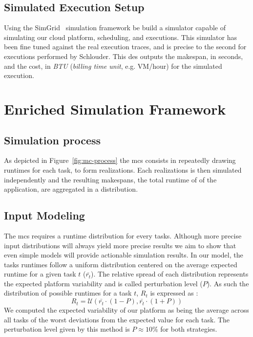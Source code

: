\documentclass[10pt,conference,compsocconf]{IEEEtran}
\begin{document}
\subsection{Simulated Execution Setup}
Using the SimGrid~\cite{simgrid} simulation framework  be build a simulator
capable of simulating our cloud platform, scheduling, and executions. This
simulator has been fine tuned against the real execution traces, and is precise
to the second for executions performed by Schlouder. This \ac{des} outputs the
makespan, in seconds, and the cost, in \emph{BTU} (\emph{billing time unit},
e.g. VM/hour) for the simulated execution.

\section{Enriched Simulation Framework}\label{sec:enriched-sim}

\subsection{Simulation process}


As depicted in Figure~\ref{fig:mc-process} the \ac{mcs} consists in repeatedly
drawing runtimes for each task, to form realizations. Each realizations is then
simulated independently and the resulting makespans, the total runtime of of the
application, are aggregated in a distribution. 

\subsection{Input Modeling}\label{sec:im}
The \ac{mcs} requires a runtime distribution for every tasks. Although more
precise input distributions will always yield more precise results we aim to
show that even simple models will provide actionable simulation results. In our
model, the tasks runtimes follow a uniform distribution centered on the average
expected runtime for a given task $t$ ($\bar{r_t}$). The relative spread of each
distribution represents the expected platform variability and is called
perturbation level ($P$). As such the distribution of possible runtimes for a task
$t$,  $R_t$ is expressed as : 
\begin{equation}
	R_t=\mathcal{U}(\bar{r_t}\cdot{}(1-P), \bar{r_t}\cdot{}(1+P)) 
\end{equation}
We computed the expected variability of our platform as being the average across
all tasks of the worst deviations from the expected value for each task.  The
perturbation level given by this method is $P\approx{}10\%$ for both strategies.
\end{document}
